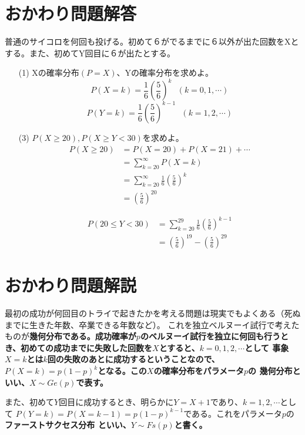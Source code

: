 \documentclass[a4j,uplatex]{jsarticle}
\begin{document}
\section*{おかわり問題解答}
普通のサイコロを何回も投げる。初めて６がでるまでに６以外が出た回数をXとする。また、初めてY回目に６が出たとする。
\begin{itemize}
  \item[(1)] Xの確率分布$(P=X)$、Yの確率分布を求めよ。
  \\ 
  \begin{equation}
    P(X=k)=\frac{1}{6} \left(\frac{5}{6}\right)^{k}~~~(k=0,1,\cdots)
  \end{equation}
  \begin{equation}
    P(Y=k)=\frac{1}{6}\left(\frac{5}{6}\right)^{k-1}~~~(k=1,2,\cdots)
  \end{equation}
  \item[(3)] $ P(X\ge20) , P(X\ge Y<30) $を求めよ。 
  \begin{equation}
    \begin{split}
      P(X\ge20)&=P(X=20)+P(X=21)+\cdots \\
      &=\sum_{k=20}^{\infty}P(X=k) \\
      &=\sum_{k=20}^{\infty}\frac{1}{6}\left(\frac{5}{6}\right)^k \\
      &=\left(\frac{5}{6}\right)^{20}
    \end{split}
  \end{equation} 

  \begin{equation}
    \begin{split}
      P(20\le Y<30)&=\sum_{k=20}^{29}\frac{1}{6}\left(\frac{5}{6}\right)^{k-1} \\
      &=\left(\frac{5}{6}\right)^{19} - \left(\frac{5}{6}\right)^{29}
    \end{split}
  \end{equation} 
\end{itemize}

\section*{おかわり問題解説}
最初の成功が何回目のトライで起きたかを考える問題は現実でもよくある（死ぬまでに生きた年数、卒業できる年数など）。
これを独立ベルヌーイ試行で考えたものが\bf 幾何分布\rm である。成功確率が$p$のベルヌーイ試行を独立に何回も行うとき、初めての成功までに失敗した回数を$X$とすると、$ k=0,1,2,\cdots $として
事象$X=k$とは$k$回の失敗のあとに成功するということなので、$ P(X=k)=p(1-p)^k $となる。この$X$の確率分布をパラメータ$p$の
幾何分布といい、$X \sim Ge(p)$で表す。
\par また、初めて$Y$回目に成功するとき、明らかに$Y=X+1$であり、$ k=1,2,\cdots $として
$P(Y=k)=P(X=k-1)=p(1-p)^{k-1}$である。これをパラメータ$p$の\bf ファーストサクセス分布 \rm といい、$Y\sim Fs(p)$と書く。
\end{document}
